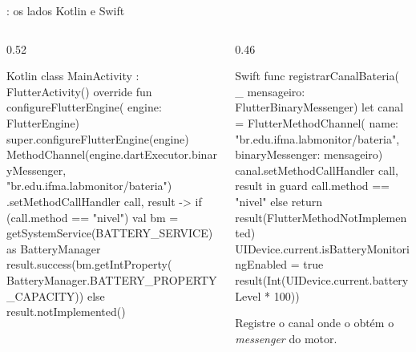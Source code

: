 \documentclass[aspectratio=169,10pt]{beamer}
\begin{document}
\begin{frame}[fragile]{: os lados Kotlin e Swift}
  \begin{columns}[T]
    \begin{column}{0.52\textwidth}
\begin{codigo}[title=android/.../MainActivity.kt]{Kotlin}
class MainActivity : FlutterActivity() {
  override fun configureFlutterEngine(
      engine: FlutterEngine) {
    super.configureFlutterEngine(engine)
    MethodChannel(engine.dartExecutor.binaryMessenger,
        "br.edu.ifma.labmonitor/bateria")
      .setMethodCallHandler { call, result ->
        if (call.method == "nivel") {
          val bm = getSystemService(BATTERY_SERVICE)
              as BatteryManager
          result.success(bm.getIntProperty(
              BatteryManager.BATTERY_PROPERTY_CAPACITY))
        } else result.notImplemented()
      }
  }
}
\end{codigo}
    \end{column}
    \begin{column}{0.46\textwidth}
\begin{codigo}[title=ios/Runner/CanalBateria.swift]{Swift}
func registrarCanalBateria(
    _ mensageiro: FlutterBinaryMessenger) {
  let canal = FlutterMethodChannel(
    name: "br.edu.ifma.labmonitor/bateria",
    binaryMessenger: mensageiro)
  canal.setMethodCallHandler { call, result in
    guard call.method == "nivel" else {
      return result(FlutterMethodNotImplemented)
    }
    UIDevice.current.isBatteryMonitoringEnabled = true
    result(Int(UIDevice.current.batteryLevel * 100))
  }
}
\end{codigo}
      \begin{dica}
        Registre o canal onde o  obtém o \emph{messenger} do motor.
      \end{dica}
    \end{column}
  \end{columns}
\end{frame}
\end{document}
